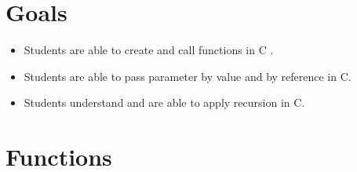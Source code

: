 \section*{Goals}
\begin{itemize}[label=$\bullet$, itemsep=-1pt, leftmargin=*]
    \item Students are able to create and call functions in C .
    \item Students are able to pass parameter by value and by reference in C.
    \item Students understand and are able to apply recursion in C.

\end{itemize}

\section{Functions}

